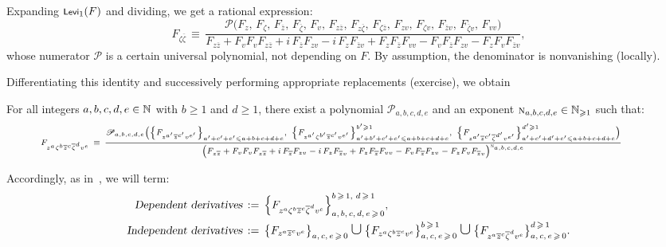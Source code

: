 \documentclass[12pt,twoside,leqno,openany]{amsart}
\begin{document}
Expanding $\text{\footnotesize{\sf Levi}}_1(F)$ and
dividing,
we get a rational expression:
\[
F_{\zeta\overline{\zeta}}
\,\equiv\,
\frac{\mathcal{P}\big(
F_z,\,
F_\zeta,\,
F_{\overline{z}},\,
F_{\overline{\zeta}},\,
F_v,\,
F_{z\overline{z}},\,
F_{z\overline{\zeta}},\,
F_{\zeta\overline{z}},\,
F_{zv},\,
F_{\zeta v},\,
F_{\overline{z}v},\,
F_{\overline{\zeta}v},\,
F_{vv}
\big)}{
F_{z\overline{z}}
+
F_vF_vF_{z\overline{z}}
+
i\,F_{\overline{z}}F_{zv}
-
i\,F_zF_{\overline{z}v}
+
F_zF_{\overline{z}}F_{vv}
-
F_vF_{\overline{z}}F_{zv}
-
F_zF_vF_{\overline{z}v}
},
\]
whose numerator $\mathcal{P}$ is a certain
universal polynomial, not depending on $F$.
By assumption, the denominator is nonvanishing (locally).

Differentiating this identity and successively performing 
appropriate replacements (exercise), we obtain

\begin{Proposition}
\label{Prp-dependent-derivatives}
For all integers $a,b,c,d,e \in \mathbb{N}$ with $b \geqslant 1$ and
$d \geqslant 1$, there exist a polynomial $\mathcal{P}_{a,b,c,d,e}$
and an exponent $\text{\sc n}_{a,b,c,d,e} \in \mathbb{N}_{\geqslant 1}$ such that:
\[
\scriptsize
\!\!\!\!\!\!\!\!\!\!\!\!\!\!\!\!\!\!\!\!
\aligned
F_{z^a\zeta^b\overline{z}^c\overline{\zeta}^dv^e}
\,\equiv\,
\frac{\mathcal{P}_{a,b,c,d,e}\Big(
\big\{
F_{z^{a'}\overline{z}^{c'}v^{e'}}
\big\}_{a'+c'+e'\leqslant a+b+c+d+e},\,\,
\big\{
F_{z^{a'}\zeta^{b'}\overline{z}^{c'}v^{e'}}
\big\}_{a'+b'+c'+e'\leqslant a+b+c+d+e}^{b'\geqslant 1},\,\,
\big\{
F_{z^{a'}\overline{z}^{c'}\overline{\zeta}^{d'}v^{e'}}
\big\}_{a'+c'+d'+e'\leqslant a+b+c+d+e}^{d'\geqslant 1}
\Big)
}{
\big(
F_{z\overline{z}}
+
F_vF_vF_{z\overline{z}}
+
i\,F_{\overline{z}}F_{zv}
-
i\,F_zF_{\overline{z}v}
+
F_zF_{\overline{z}}F_{vv}
-
F_vF_{\overline{z}}F_{zv}
-
F_zF_vF_{\overline{z}v}
\big)^{\NN_{a,b,c,d,e}}
}
\endaligned
\]
\end{Proposition}

Accordingly, as in~{\cite{Chen-Merker-2019}}, we will term:
\[
\aligned
\text{\sl Dependent derivatives}
&
\,:=\,
\Big\{
F_{z^a\zeta^b\overline{z}^c\overline{\zeta}^dv^e}
\Big\}_{a,\,b,\,c,\,d,\,e\,\geqslant\,0}^{b\,\geqslant\,1,\,\,
d\,\geqslant\,1},
\\
\text{\sl Independent derivatives}
&
\,:=\,
\big\{
F_{z^a\overline{z}^cv^e}
\big\}_{a,\,c,\,e\,\geqslant\,0}
\medcup
\big\{
F_{z^a\zeta^b\overline{z}^cv^e}
\big\}_{a,\,c,\,e\,\geqslant\,0}^{b\,\geqslant\,1}
\medcup
\big\{
F_{z^a\overline{z}^c\overline{\zeta}^dv^e}
\big\}_{a,\,c,\,e\,\geqslant\,0}^{d\,\geqslant\,1}.
\endaligned
\]
\end{document}
